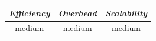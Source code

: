 \begin{center}
{\footnotesize
\begin{tabular}{ccc}
\emph{Efficiency} & \emph{Overhead} & \emph{Scalability} \\
\hline
medium &
medium &
medium
\end{tabular}
}
\end{center}


